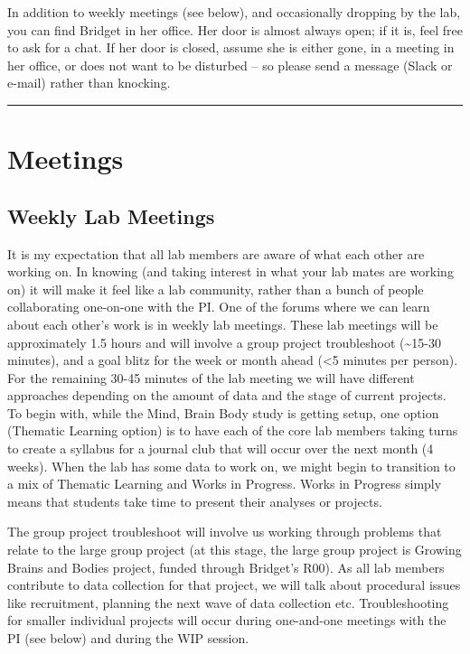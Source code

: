 \documentclass[]{book}
\begin{document}
In addition to weekly meetings (see below), and occasionally dropping by the lab, you can find Bridget in her office. Her door is almost always open; if it is, feel free to ask for a chat. If her door is closed, assume she is either gone, in a meeting in her office, or does not want to be disturbed -- so please send a message (Slack or e-mail) rather than knocking.

\begin{center}\rule{0.5\linewidth}{0.5pt}\end{center}

\hypertarget{meetings}{%
\section{Meetings}\label{meetings}}

\hypertarget{weekly-lab-meetings}{%
\subsection{Weekly Lab Meetings}\label{weekly-lab-meetings}}

It is my expectation that all lab members are aware of what each other are working on. In knowing (and taking interest in what your lab mates are working on) it will make it feel like a lab community, rather than a bunch of people collaborating one-on-one with the PI. One of the forums where we can learn about each other's work is in weekly lab meetings. These lab meetings will be approximately 1.5 hours and will involve a group project troubleshoot (\textasciitilde{}15-30 minutes), and a goal blitz for the week or month ahead (\textless{}5 minutes per person). For the remaining 30-45 minutes of the lab meeting we will have different approaches depending on the amount of data and the stage of current projects. To begin with, while the Mind, Brain Body study is getting setup, one option (Thematic Learning option) is to have each of the core lab members taking turns to create a syllabus for a journal club that will occur over the next month (4 weeks). When the lab has some data to work on, we might begin to transition to a mix of Thematic Learning and Works in Progress. Works in Progress simply means that students take time to present their analyses or projects.

The group project troubleshoot will involve us working through problems that relate to the large group project (at this stage, the large group project is Growing Brains and Bodies project, funded through Bridget's R00). As all lab members contribute to data collection for that project, we will talk about procedural issues like recruitment, planning the next wave of data collection etc. Troubleshooting for smaller individual projects will occur during one-and-one meetings with the PI (see below) and during the WIP session.
\end{document}
